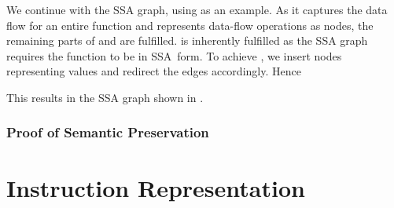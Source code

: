 We continue with the \gls{SSA graph}, using
 as an example.
%
As it captures the data flow for an entire \gls{function} and represents
data-flow \glspl{operation} as \glspl{node}, the remaining parts of
 and
 are fulfilled.
%
 is inherently fulfilled as the \gls{SSA graph}
requires the \gls{function} to be in \gls{SSA}~form.
%
To achieve , we insert \glspl{node}
representing values and redirect the \glspl{edge} accordingly.
%
Hence 


This results in the \gls{SSA graph} shown in
.





\subsubsection{Proof of Semantic Preservation}




\section{Instruction Representation}

